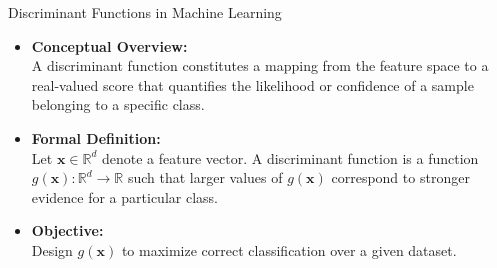 \documentclass[serif, aspectratio=169]{beamer}
\begin{document}
    \begin{frame}{Discriminant Functions in Machine Learning}
        \begin{itemize}\itemsep1.2em
        \item \textbf{Conceptual Overview:}\\
        A discriminant function constitutes a mapping from the feature space to a real-valued score that quantifies the likelihood or confidence of a sample belonging to a specific class.
        \item \textbf{Formal Definition:}\\
        Let $\mathbf{x} \in \mathbb{R}^d$ denote a feature vector. A discriminant function is a function $g(\mathbf{x}) : \mathbb{R}^d \rightarrow \mathbb{R}$ such that larger values of $g(\mathbf{x})$ correspond to stronger evidence for a particular class.
        \item \textbf{Objective:}\\
        Design $g(\mathbf{x})$ to maximize correct classification over a given dataset.
        \end{itemize}
    \end{frame}
\end{document}
